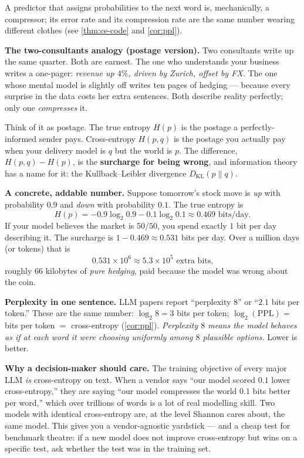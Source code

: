 \begin{intuition}
A predictor that assigns probabilities to the next word is, mechanically,
a compressor; its error rate and its compression rate are the same
number wearing different clothes (see \cref{thm:ce-code} and
\cref{cor:ppl}).

\medskip
\textbf{The two-consultants analogy (postage version).}  Two
consultants write up the same quarter.  Both are earnest.  The one
who understands your business writes a one-pager: \emph{revenue up
$4\%$, driven by Zurich, offset by FX.}  The one whose mental model
is slightly off writes ten pages of hedging --- because every
surprise in the data costs her extra sentences.  Both describe
reality perfectly; only one \emph{compresses} it.

Think of it as postage.  The true entropy $H(p)$ is the postage a
perfectly-informed sender pays.  Cross-entropy $H(p,q)$ is the
postage you actually pay when your delivery model is $q$ but the
world is $p$.  The difference, $H(p,q) - H(p)$, is the
\textbf{surcharge for being wrong}, and information theory has a
name for it: the Kullback--Leibler divergence $D_{\mathrm{KL}}(p\|q)$.

\medskip
\textbf{A concrete, addable number.}  Suppose tomorrow's stock move
is \emph{up} with probability $0.9$ and \emph{down} with probability
$0.1$.  The true entropy is
\[
 H(p) = -0.9\log_2 0.9 - 0.1\log_2 0.1 \approx 0.469 \text{ bits/day.}
\]
If your model believes the market is $50/50$, you spend exactly $1$
bit per day describing it.  The surcharge is
$1 - 0.469 \approx 0.531$ bits per day.  Over a million days (or
tokens) that is
\[
  0.531 \times 10^{6} \approx 5.3 \times 10^{5} \text{ extra bits,}
\]
roughly $66$ kilobytes of \emph{pure hedging}, paid because the model
was wrong about the coin.

\medskip
\textbf{Perplexity in one sentence.}  LLM papers report ``perplexity
$8$'' or ``$2.1$ bits per token.''  These are the same number:
$\log_2 8 = 3$ bits per token; $\log_2(\mathrm{PPL}) =$ bits per
token $=$ cross-entropy (\cref{cor:ppl}).  \emph{Perplexity $8$
means the model behaves as if at each word it were choosing
uniformly among $8$ plausible options.}  Lower is better.

\medskip
\textbf{Why a decision-maker should care.}  The training objective
of every major LLM \emph{is} cross-entropy on text.  When a vendor
says ``our model scored $0.1$ lower cross-entropy,'' they are saying
``our model compresses the world $0.1$ bits better per word,'' which
over trillions of words is a lot of real modelling skill.  Two
models with identical cross-entropy are, at the level Shannon cares
about, the same model.  This gives you a vendor-agnostic yardstick
--- and a cheap test for benchmark theatre: if a new model does not
improve cross-entropy but wins on a specific test, ask whether the
test was in the training set.
\end{intuition}


